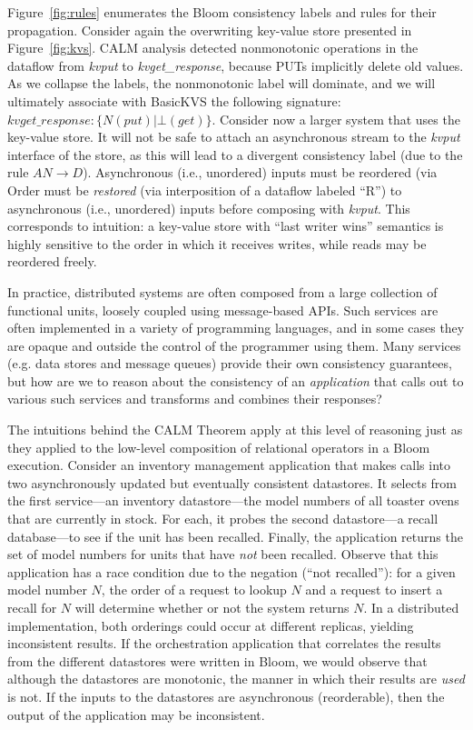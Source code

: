Figure~\ref{fig:rules} enumerates the Bloom consistency labels and rules for their propagation.
Consider again the overwriting key-value store presented in Figure~\ref{fig:kvs}.
CALM analysis detected nonmonotonic operations in the dataflow from \emph{kvput}
to \emph{kvget\_response}, because PUTs implicitly delete old values.  As we collapse the labels,
the nonmonotonic label will dominate, and we will ultimately associate with BasicKVS the following signature:
$kvget\_response: \{N(put) | \bot(get)\}$.
Consider now a larger system that uses the key-value store.  It will not be safe to attach an asynchronous
stream to the \emph{kvput} interface of the store, as this will lead to a divergent consistency label
(due to the rule $AN \rightarrow D$).  Asynchronous (i.e., unordered) inputs must be reordered (via
Order must be \emph{restored} (via
interposition of a dataflow labeled ``R'') 
to asynchronous (i.e., unordered) inputs
before composing with \emph{kvput}.  This corresponds to intuition:
a key-value store with ``last writer wins'' semantics is highly sensitive to the order in which it receives writes,
while reads may be reordered freely.

In practice, distributed systems are often composed from a large 
collection of functional units, loosely coupled using message-based APIs.
Such services are often implemented in a variety of programming 
languages, and in some cases they are opaque and outside the control of
the programmer using them.  
Many services (e.g. data stores and message queues) provide their own 
consistency guarantees, but how are we to reason about the consistency of an
\emph{application} that calls out to various such services and transforms
and combines their responses?  

The intuitions behind the CALM Theorem apply at this level of reasoning
just as they applied to the low-level composition of relational operators
in a Bloom execution.  Consider an inventory management application 
that makes calls into two asynchronously updated but
eventually consistent datastores.  It selects from the first service---an 
inventory datastore---the model numbers of all toaster ovens that are currently in stock.  For each, it probes the second datastore---a recall database---to
see if the unit has been recalled.  Finally, the application returns the 
set of model numbers for units that have \emph{not} been recalled.  Observe that this
application has a race condition due to the negation (``not recalled''): for a given model number $N$, the order of a request to lookup $N$ and a request to insert a recall for $N$ will determine whether or not the system returns $N$.  In a distributed implementation, both orderings could occur at different replicas, yielding inconsistent results.  If the orchestration
application that correlates the results from the different datastores were written in Bloom, we would observe that although the datastores are monotonic, 
the manner in which their results are \emph{used} is not.  If the inputs to 
the datastores are asynchronous (reorderable), then the output of the 
application may be inconsistent.


